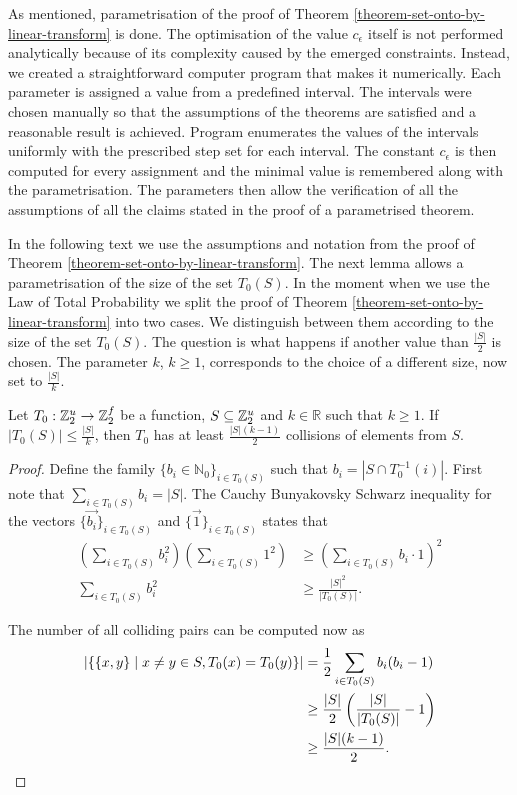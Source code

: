 As mentioned, parametrisation of the proof of Theorem \ref{theorem-set-onto-by-linear-transform} is done. The optimisation of the value $c_\epsilon$ itself is not performed analytically because of its complexity caused by the emerged constraints. Instead, we created a straightforward computer program that makes it numerically. Each parameter is assigned a value from a predefined interval. The intervals were chosen manually so that the assumptions of the theorems are satisfied and a reasonable result is achieved. Program enumerates the values of the intervals uniformly with the prescribed step set for each interval. The constant $c_\epsilon$ is then computed for every assignment and the minimal value is remembered along with the parametrisation. The parameters then allow the verification of all the assumptions of all the claims stated in the proof of a parametrised theorem.

In the following text we use the assumptions and notation from the proof of Theorem \ref{theorem-set-onto-by-linear-transform}. The next lemma allows a parametrisation of the size of the set $T_0(S)$. In the moment when we use the Law of Total Probability we split the proof of Theorem \ref{theorem-set-onto-by-linear-transform} into two cases. We distinguish between them according to the size of the set $T_0(S)$. The question is what happens if another value than $\frac{|S|}{2}$ is chosen. The parameter $k$, $k \geq 1$, corresponds to the choice of a different size, now set to $\frac{|S|}{k}$.

\begin{lemma}
\label{lemma-collision-count}
Let $T_0: \mathbb{Z}_{2}^{u} \rightarrow \mathbb{Z}_{2}^{f}$ be a function, $S \subseteq \mathbb{Z}_{2}^{u}$ and $k \in \mathbb{R}$ such that $k \geq 1$. If $|T_0(S)| \leq \frac{|S|}{k}$, then $T_0$ has at least $\frac{|S|(k - 1)}{2}$ collisions of elements from $S$.
\end{lemma} 
\begin{proof}
Define the family $\{b_i \in \mathbb{N}_0\}_{i \in T_0(S)}$ such that $b_i = \left|S \cap T_0^{-1}(i)\right|$. First note that $\sum_{i \in T_0(S)} b_i = |S|$. The Cauchy Bunyakovsky Schwarz inequality for the vectors $\{\vec{b_i}\}_{i \in T_0(S)}$ and $\{\vec{1}\}_{i \in T_0(S)}$ states that
\[
\begin{split}
\displaystyle \left(\sum_{i \in T_0(S)} b_i ^ 2\right)\left(\sum_{i \in T_0(S)} 1 ^ 2\right) &\geq \left(\sum_{i \in T_0(S)} b_i \cdot 1 \right) ^ 2 \\ 
\displaystyle \sum_{i \in T_0(S)} b_i ^ 2 & \geq \frac{|S| ^ 2}{|T_0(S)|} \text{.}
\end{split}
\]

The number of all colliding pairs can be computed now as
\[
\begin{split}
|\{ \{x, y\} \mid x \neq y \in S, T_0(x) = T_0(y) \}| 
	& = \frac{1}{2} \sum_{i \in T_0(S)} b_i (b_i - 1) \\ 
	& \geq \frac{|S|}{2}\left(\frac{|S|}{|T_0(S)|} - 1\right) \\
	& \geq \frac{|S|(k - 1)}{2} \text{.}
\end{split}
\]
\end{proof}

